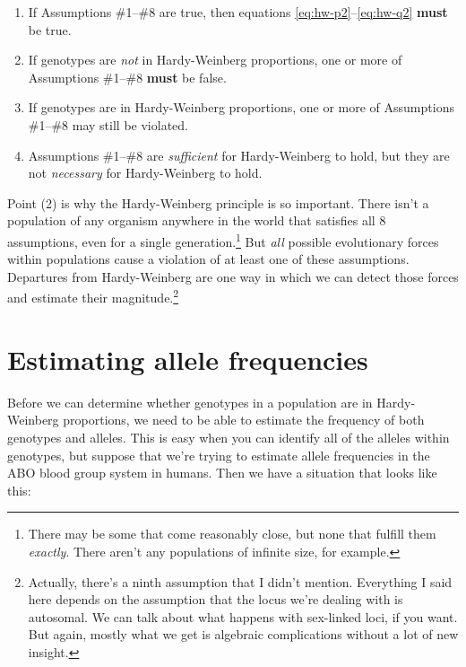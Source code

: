 \documentclass[12pt]{article}
\begin{document}
\begin{enumerate}

\item If Assumptions \#1--\#8 are true, then equations
  \ref{eq:hw-p2}--\ref{eq:hw-q2} {\bf must} be true.

\item If genotypes are {\it not\/} in Hardy-Weinberg proportions, one
  or more of Assumptions \#1--\#8 {\bf must} be false.

\item If genotypes are in Hardy-Weinberg proportions, one or more of
  Assumptions \#1--\#8 may still be violated.

\item Assumptions \#1--\#8 are {\it sufficient\/} for Hardy-Weinberg
  to hold, but they are not {\it necessary\/} for Hardy-Weinberg to
  hold.

\end{enumerate}

Point (2) is why the Hardy-Weinberg principle is so important. There
isn't a population of any organism anywhere in the world that
satisfies all 8 assumptions, even for a single
generation.\footnote{There may be some that come reasonably close, but
  none that fulfill them {\it exactly}. There aren't any populations
  of infinite size, for example.}  But {\it all\/} possible
evolutionary forces within populations cause a violation of at least
one of these assumptions. Departures from Hardy-Weinberg are one way
in which we can detect those forces and estimate their
magnitude.\footnote{Actually, there's a ninth assumption that I didn't
  mention. Everything I said here depends on the assumption that the
  locus we're dealing with is autosomal. We can talk about what
  happens with sex-linked loci, if you want. But again, mostly what we
  get is algebraic complications without a lot of new insight.}

\section*{Estimating allele frequencies}

Before we can determine whether genotypes in a population are in
Hardy-Weinberg proportions, we need to be able to estimate the
frequency of both genotypes and alleles. This is easy when you can
identify all of the alleles within genotypes, but suppose that we're
trying to estimate allele frequencies in the ABO blood group system in
humans. Then we have a situation that looks like this:
\end{document}

